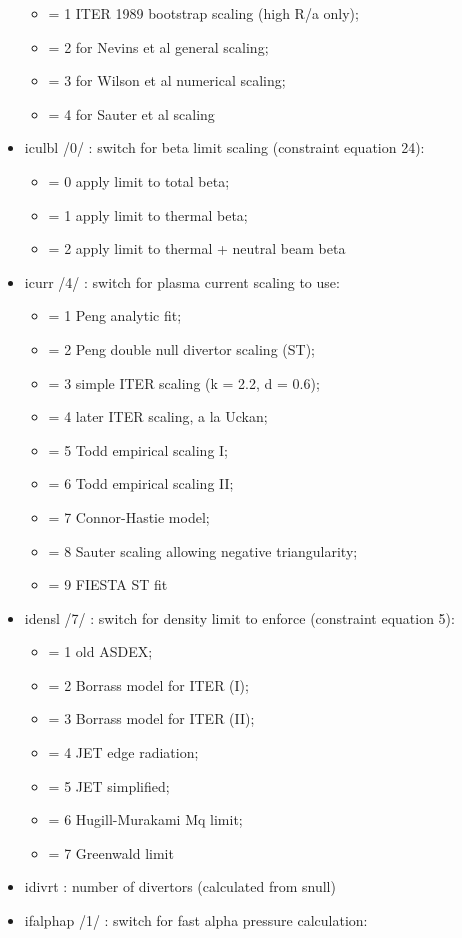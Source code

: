 \documentclass[]{article}
\providecommand{\tightlist}{%
  \setlength{\itemsep}{0pt}\setlength{\parskip}{0pt}}
\begin{document}
\begin{itemize}
  \begin{itemize}
  \tightlist
  \item
    = 1 ITER 1989 bootstrap scaling (high R/a only);
  \item
    = 2 for Nevins et al general scaling;
  \item
    = 3 for Wilson et al numerical scaling;
  \item
    = 4 for Sauter et al scaling
  \end{itemize}
\item
  iculbl /0/ : switch for beta limit scaling (constraint equation 24):

  \begin{itemize}
  \tightlist
  \item
    = 0 apply limit to total beta;
  \item
    = 1 apply limit to thermal beta;
  \item
    = 2 apply limit to thermal + neutral beam beta
  \end{itemize}
\item
  icurr /4/ : switch for plasma current scaling to use:

  \begin{itemize}
  \tightlist
  \item
    = 1 Peng analytic fit;
  \item
    = 2 Peng double null divertor scaling (ST);
  \item
    = 3 simple ITER scaling (k = 2.2, d = 0.6);
  \item
    = 4 later ITER scaling, a la Uckan;
  \item
    = 5 Todd empirical scaling I;
  \item
    = 6 Todd empirical scaling II;
  \item
    = 7 Connor-Hastie model;
  \item
    = 8 Sauter scaling allowing negative triangularity;
  \item
    = 9 FIESTA ST fit
  \end{itemize}
\item
  idensl /7/ : switch for density limit to enforce (constraint equation
  5):

  \begin{itemize}
  \tightlist
  \item
    = 1 old ASDEX;
  \item
    = 2 Borrass model for ITER (I);
  \item
    = 3 Borrass model for ITER (II);
  \item
    = 4 JET edge radiation;
  \item
    = 5 JET simplified;
  \item
    = 6 Hugill-Murakami Mq limit;
  \item
    = 7 Greenwald limit
  \end{itemize}
\item
  idivrt : number of divertors (calculated from snull)
\item
  ifalphap /1/ : switch for fast alpha pressure calculation:


\end{itemize}
\end{document}
